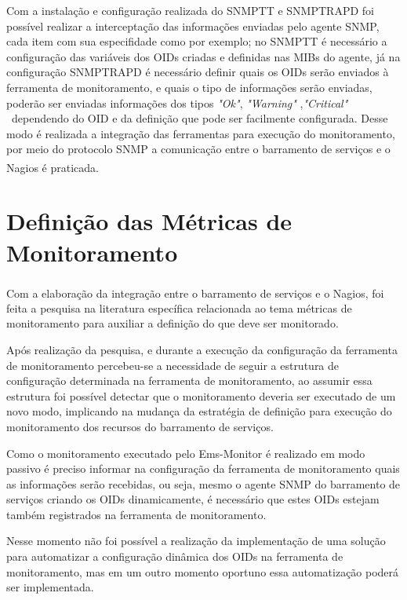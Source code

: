 Com a instalação e configuração realizada do \acrshort{SNMPTT} e SNMPTRAPD foi possível realizar a interceptação das informações enviadas pelo agente \acrshort{SNMP}, cada item com sua especifidade como por exemplo; no \acrshort{SNMPTT} é necessário a configuração das variáveis dos \acrshort{OID}s  criadas e definidas nas \acrshort{MIBs} do agente, já na configuração SNMPTRAPD é necessário definir quais os \acrshort{OID}s serão enviados à ferramenta de monitoramento, e quais o tipo de informações serão enviadas, poderão ser enviadas informações dos tipos  \textit{"Ok"}, \textit{"Warning"} ,\textit{"Critical"} \ dependendo do \acrshort{OID} e da definição que pode ser facilmente configurada. Desse modo é realizada a integração das ferramentas para execução do monitoramento, por meio do protocolo \acrshort{SNMP} a comunicação entre o barramento de serviços e o Nagios\textsuperscript{\textregistered} é praticada.  


\section{Definição das Métricas de Monitoramento}
\label{metricas_monitoramento}

Com a elaboração da integração entre o barramento de serviços e o Nagios\textsuperscript{\textregistered}, foi feita a pesquisa na literatura específica relacionada ao tema métricas de monitoramento para auxiliar a definição do que deve ser monitorado. 

Após realização da pesquisa, e durante a execução da configuração da ferramenta de monitoramento percebeu-se a necessidade de seguir a estrutura de configuração determinada na ferramenta de monitoramento, ao assumir essa estrutura foi possível detectar que o monitoramento deveria ser executado de um novo modo, implicando na mudança da estratégia de definição para execução do monitoramento dos recursos do barramento de serviços. 

Como o monitoramento executado pelo Ems-Monitor é realizado em modo passivo é preciso informar na configuração da ferramenta de monitoramento quais as informações serão recebidas, ou seja, mesmo o agente \acrshort{SNMP} do barramento de serviços criando os \acrshort{OID}s dinamicamente, é necessário que estes \acrshort{OID}s estejam também registrados na ferramenta de monitoramento. 

Nesse momento  não foi possível a realização da implementação de uma solução para automatizar a configuração dinâmica dos \acrshort{OID}s na ferramenta de monitoramento, mas em um outro momento oportuno essa automatização poderá ser implementada.

